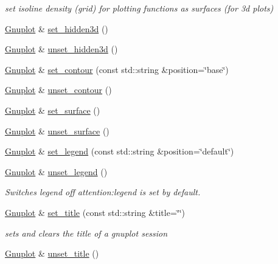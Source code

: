 \begin{DoxyCompactItemize}
\begin{DoxyCompactList}\small\item\em set isoline density (grid) for plotting functions as surfaces (for 3d plots) \end{DoxyCompactList}\item 
\hyperlink{classkukadu_1_1Gnuplot}{Gnuplot} \& \hyperlink{classkukadu_1_1Gnuplot_ac6aa969947a3e5ad968726b58d839d0a}{set\+\_\+hidden3d} ()
\item 
\hyperlink{classkukadu_1_1Gnuplot}{Gnuplot} \& \hyperlink{classkukadu_1_1Gnuplot_a4e93a0f9c069b953a70502765d31dc1e}{unset\+\_\+hidden3d} ()
\item 
\hyperlink{classkukadu_1_1Gnuplot}{Gnuplot} \& \hyperlink{classkukadu_1_1Gnuplot_a6666c2286bcd0f8fea294b94a6c8545c}{set\+\_\+contour} (const std\+::string \&position=\char`\"{}base\char`\"{})
\item 
\hyperlink{classkukadu_1_1Gnuplot}{Gnuplot} \& \hyperlink{classkukadu_1_1Gnuplot_a6fe8c0d459872698c3531c50cf57be88}{unset\+\_\+contour} ()
\item 
\hyperlink{classkukadu_1_1Gnuplot}{Gnuplot} \& \hyperlink{classkukadu_1_1Gnuplot_a2b1dba26cececc7cb0c0c3d6c6345c18}{set\+\_\+surface} ()
\item 
\hyperlink{classkukadu_1_1Gnuplot}{Gnuplot} \& \hyperlink{classkukadu_1_1Gnuplot_a23283eaf224fede9a5a9378f678226a1}{unset\+\_\+surface} ()
\item 
\hyperlink{classkukadu_1_1Gnuplot}{Gnuplot} \& \hyperlink{classkukadu_1_1Gnuplot_aca9ce23dbc33bd29ff563c23a29e47ae}{set\+\_\+legend} (const std\+::string \&position=\char`\"{}default\char`\"{})
\item 
\hyperlink{classkukadu_1_1Gnuplot}{Gnuplot} \& \hyperlink{classkukadu_1_1Gnuplot_a5c8dab8e316a7d9b316d45f715ff0859}{unset\+\_\+legend} ()
\begin{DoxyCompactList}\small\item\em Switches legend off attention\+:legend is set by default. \end{DoxyCompactList}\item 
\hyperlink{classkukadu_1_1Gnuplot}{Gnuplot} \& \hyperlink{classkukadu_1_1Gnuplot_a1f0757bd29d5e3bee4e23be95951bc13}{set\+\_\+title} (const std\+::string \&title=\char`\"{}\char`\"{})
\begin{DoxyCompactList}\small\item\em sets and clears the title of a gnuplot session \end{DoxyCompactList}\item 
\hyperlink{classkukadu_1_1Gnuplot}{Gnuplot} \& \hyperlink{classkukadu_1_1Gnuplot_a5fc9e87f3c624fbff79a960c66a16bd1}{unset\+\_\+title} ()

\end{DoxyCompactItemize}
